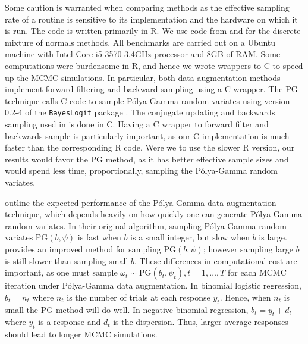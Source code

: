 \documentclass[12pt]{article}
\newcommand{\Polya}{P\'{o}lya}
\newcommand{\PG}{\text{PG}}
\begin{document}
Some caution is warranted when comparing methods as the effective sampling rate
of a routine is sensitive to its implementation and the hardware on which it is
run. The code is written primarily in R.  We use code from
\cite{binomlogit-2012} and \cite{fruhwirth-schnatter-book-2007} for the discrete
mixture of normals methods.  All benchmarks are carried out on a Ubuntu machine
with Intel Core i5-3570 3.4GHz processor and 8GB of RAM.  Some computations were
burdensome in R, and hence we wrote wrappers to C to speed up the MCMC
simulations.  In particular, both data augmentation methods implement forward
filtering and backward sampling using a C wrapper.  The PG technique calls C
code to sample \Polya-Gamma random variates using version 0.2-4 of the
\texttt{BayesLogit} package \citep{bayeslogit-2013}.  The conjugate updating and
backwards sampling used in \cite{ravines-etal-2006} is done in C.  Having a C
wrapper to forward filter and backwards sample is particularly important, as our
C implementation is much faster than the corresponding R code.  Were we to use
the slower R version, our results would favor the PG method, as it has better
effective sample sizes and would spend less time, proportionally, sampling the
\Polya-Gamma random variates.

\cite{polson-etal-2013} outline the expected performance of the \Polya-Gamma
data augmentation technique, which depends heavily on how quickly one can
generate \Polya-Gamma random variates.  In their original algorithm, sampling
\Polya-Gamma random variates $\PG(b,\psi)$ is fast when $b$ is a small integer,
but slow when $b$ is large. \cite{windle-thesis-2013} provides an improved
method for sampling $\PG(b,\psi)$; however sampling large $b$ is still slower
than sampling small $b$.  These differences in computational cost are important,
as one must sample $\omega_t \sim \PG(b_t, \psi_t), t=1,\ldots,T$ for each MCMC
iteration under \Polya-Gamma data augmentation.  In binomial logistic
regression, $b_t = n_t$ where $n_t$ is the number of trials at each response
$y_t$.  Hence, when $n_t$ is small the PG method will do well.  In negative
binomial regression, $b_t = y_t + d_t$ where $y_t$ is a response and $d_t$ is
the dispersion.  Thus, larger average responses should lead to longer MCMC
simulations.
\end{document}
